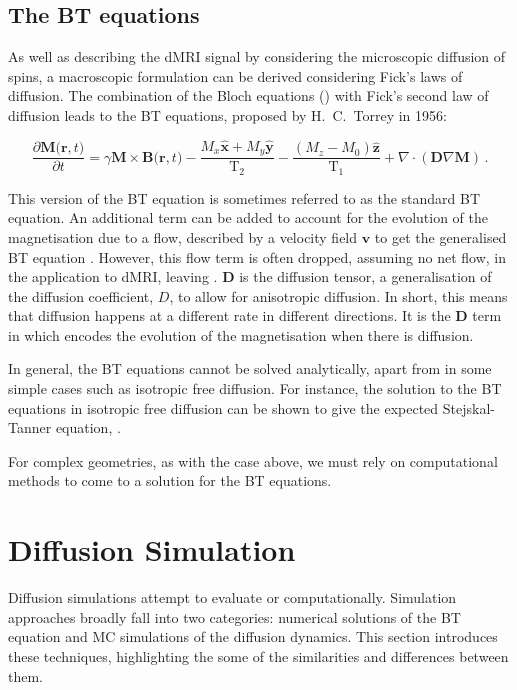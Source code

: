 \subsection{The \acl{BT} equations}
\label{sec:bg_bloch_torrey}
As well as describing the \ac{dMRI} signal by considering the microscopic diffusion of spins, a macroscopic formulation can be derived considering Fick's laws of diffusion. The combination of the Bloch equations () with Fick's second law of diffusion leads to the \ac{BT} equations, proposed by H.\ C.\ Torrey in 1956\cite{Torrey1956,Callaghan1991,Price2009}:

\begin{equation}
  \frac{\partial\mathbf{M(r},t)}{\partial t} = \gamma \mathbf{M \times B(r}, t) - \frac{M_x\mathbf{\hat{x}} + M_y\mathbf{\hat{y}}}{\mathrm{T}_2} - \frac{(M_z - M_0)\mathbf{\hat{z}}}{\mathrm{T}_1} + \nabla \cdot \left(\mathbf{D} \nabla \mathbf{M}\right)\,.
  \label{eq:bloch_torrey}
\end{equation}

This version of the \ac{BT} equation is sometimes referred to as the standard \ac{BT} equation. An additional term can be added to account for the evolution of the magnetisation due to a flow, described by a velocity field $\mathbf{v}$ to get the generalised \ac{BT} equation \cite{Jeener2002,Beltrachini2016}. However, this flow term is often dropped, assuming no net flow, in the application to \ac{dMRI}, leaving . 
$\mathbf{D}$ is the diffusion tensor, a generalisation of the diffusion coefficient, $D$, to allow for anisotropic diffusion. In short, this means that diffusion happens at a different rate in different directions.
It is the $\mathbf{D}$ term in  which encodes the evolution of the magnetisation when there is diffusion.

In general, the \ac{BT} equations cannot be solved analytically, apart from in some simple cases such as isotropic free diffusion.
For instance, the solution to the \ac{BT} equations in isotropic free diffusion can be shown to give the expected Stejskal-Tanner equation,  \cite{Price1997}.

For complex geometries, as with the case above, we must rely on computational methods to come to a solution for the \ac{BT} equations. 



\section{Diffusion Simulation}
\label{sec:diffusion_simulation}
Diffusion simulations attempt to evaluate  or  computationally. Simulation approaches broadly fall into two categories: numerical solutions of the \ac{BT} equation and \ac{MC} simulations of the diffusion dynamics. This section introduces these techniques, highlighting the some of the similarities and differences between them. 


